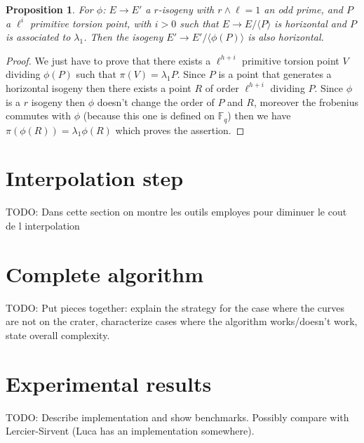 \documentclass{article}
\newcommand{\todo}[1]{{\color{red}TODO: #1}}
\theoremstyle{plain}
\newtheorem{prop}[thm]{Proposition}
\theoremstyle{definition}
\theoremstyle{remark}
\begin{document}
\begin{prop}
For $\phi$: $E \rightarrow E'$ a $r$-isogeny  with $r \wedge \ell=1$ an odd prime, and $P$ a $\ell^i$ primitive torsion point, with $i>0$ such that $E \rightarrow E / \langle P \rangle $ is horizontal and $P$ is associated to $\lambda_1$. Then the isogeny  $E' \rightarrow E' / \langle \phi(P) \rangle$ is also horizontal.
\end{prop}

\begin{proof}
We just have to prove that there exists a $\ell^{h+i}$ primitive torsion point $V$ dividing $\phi(P)$ such that $\pi(V)=\lambda_1P$.
Since $P$ is a point that generates a horizontal isogeny then there exists a point $R$ of order $\ell^{h+i}$ dividing $P$. Since $\phi$ is a $r$ isogeny then $\phi$ doesn't change the order of $P$ and $R$, moreover the frobenius commutes with $\phi$ (because this one is defined on $\mathbb{F}_q$) then we have $\pi(\phi(R))=\lambda_1\phi(R)$ which proves the assertion.
\end{proof}


\section{Interpolation step}
\label{sec:interpolation}
\todo{Dans cette section on montre les outils employes pour diminuer le cout de l interpolation}


\section{Complete algorithm}
\label{sec:complete-algorithm}
\todo{Put pieces together: explain the strategy for the case where the
  curves are not on the crater, characterize cases where the algorithm
  works/doesn't work, state overall complexity.}


\section{Experimental results}
\label{sec:implem}

\todo{Describe implementation and show benchmarks. Possibly compare
  with Lercier-Sirvent (Luca has an implementation somewhere).}



\end{document}
